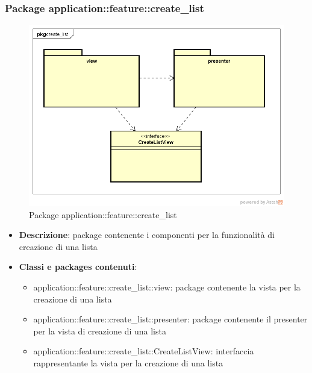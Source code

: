 \subsubsection{Package application::feature::create\_list}
\label{Package application::feature::create_list}
\begin{figure}[H]
	\centering
	\includegraphics[scale=0.5]{Sezioni/Packages/Application/create_list.png}
	\caption{Package application::feature::create\_list}
\end{figure}
\begin{itemize}
	\item \textbf{Descrizione}: package contenente i componenti per la funzionalità di creazione di una lista
	\item \textbf{Classi e packages contenuti}:
	\begin{itemize}
	\item application::feature::create\_list::view: package contenente la vista per la creazione di una lista
	\item application::feature::create\_list::presenter: package contenente il presenter per la vista di creazione di una lista
	\item application::feature::create\_list::CreateListView: interfaccia rappresentante la vista per la creazione di una lista
	\end{itemize}
\end{itemize}

